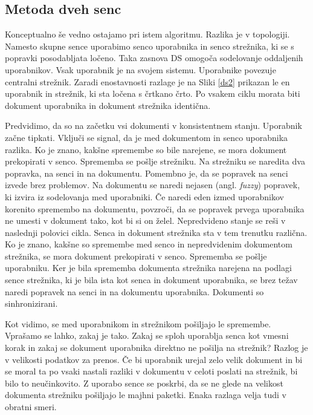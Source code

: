\documentclass[a4paper, 12pt, twoside]{book}
\begin{document}
\subsection{Metoda dveh senc}

Konceptualno še vedno ostajamo pri istem algoritmu. Razlika je v topologiji. Namesto skupne sence uporabimo senco uporabnika in senco strežnika, ki se s popravki posodabljata ločeno. Taka zasnova DS omogoča sodelovanje oddaljenih uporabnikov. Vsak uporabnik je na svojem sistemu. Uporabnike povezuje centralni strežnik. Zaradi enostavnosti razlage je na Sliki \ref{ds2} prikazan le en uporabnik in strežnik, ki sta ločena s črtkano črto. Po vsakem ciklu morata biti dokument uporabnika in dokument strežnika identična.

Predvidimo, da so na začetku vsi dokumenti v konsistentnem stanju. Uporabnik začne tipkati. Vključi se signal, da je med dokumentom in senco uporabnika razlika. Ko je znano, kakšne spremembe so bile narejene, se mora dokument prekopirati v senco. Sprememba se pošlje strežniku. Na strežniku se naredita dva popravka, na senci in na dokumentu. Pomembno je, da se popravek na senci izvede brez problemov. Na dokumentu se naredi nejasen (angl. \textit{fuzzy}) popravek, ki izvira iz sodelovanja med uporabniki. Če naredi eden izmed uporabnikov korenito spremembo na dokumentu, povzroči, da se popravek prvega uporabnika ne umesti v dokument tako, kot bi si on želel. Nepredvideno stanje se reši v naslednji polovici cikla. Senca in dokument strežnika sta v tem trenutku različna. Ko je znano, kakšne so spremembe med senco in nepredvidenim dokumentom strežnika, se mora dokument prekopirati v senco. Sprememba se pošlje uporabniku. Ker je bila sprememba dokumenta strežnika narejena na podlagi sence strežnika, ki je bila ista kot senca in dokument uporabnika, se brez težav naredi popravek na senci in na dokumentu uporabnika. Dokumenti so sinhronizirani.

Kot vidimo, se med uporabnikom in strežnikom pošiljajo le spremembe. Vprašamo se lahko, zakaj je tako. Zakaj se sploh uporablja senca kot vmesni korak in zakaj se dokument uporabnika direktno ne pošilja na strežnik? Razlog je v velikosti podatkov za prenos. Če bi uporabnik urejal zelo velik dokument in bi se moral ta po vsaki nastali razliki v dokumentu v celoti poslati na strežnik, bi bilo to neučinkovito. Z uporabo sence se poskrbi, da se ne glede na velikost dokumenta strežniku pošiljajo le majhni paketki. Enaka razlaga velja tudi v obratni smeri.
\end{document}
